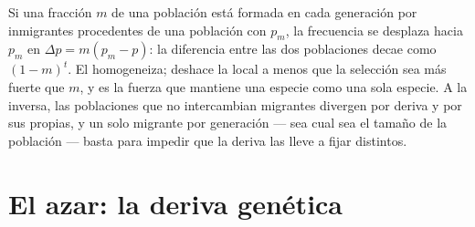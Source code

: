 \begin{proposition}\label{prop:b2:population-genetics:migration}
Si una fracción $m$ de una población está formada en cada generación por
inmigrantes procedentes de una población con  $p_{m}$,
la frecuencia se desplaza hacia $p_{m}$ en $\Delta p = m(p_{m} - p)$: la
diferencia entre las dos poblaciones decae como $(1 - m)^{t}$. El
\emph{} homogeneiza; deshace la  local a menos que
la selección sea más fuerte que $m$, y es la fuerza que mantiene una
especie como una sola especie. A la inversa, las poblaciones que no
intercambian migrantes divergen por deriva y por sus  propias, y
un solo migrante por generación --- sea cual sea el tamaño de la
población --- basta para impedir que la deriva las lleve a fijar 
distintos.
\end{proposition}

\section{El azar: la deriva genética}

